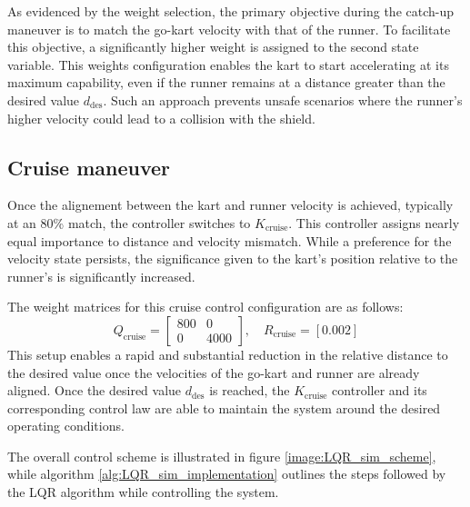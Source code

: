 \documentclass[a4paper,12pt,oneside]{book}
\begin{document}
As evidenced by the weight selection, the primary objective during the catch-up maneuver is to match the go-kart velocity with that of the runner.
To facilitate this objective, a significantly higher weight is assigned to the second state variable.
This weights configuration enables the kart to start accelerating at its maximum capability, even if the runner remains at a distance greater than the desired value $d_{\text{des}}$.
Such an approach prevents unsafe scenarios where the runner's higher velocity could lead to a collision with the shield.

\subsection{Cruise maneuver}
Once the alignement between the kart and runner velocity is achieved, typically at an 80\% match, the controller switches to $K_{\text{cruise}}$.
This controller assigns nearly equal importance to distance and velocity mismatch.
While a preference for the velocity state persists, the significance given to the kart's position relative to the runner's is significantly increased.

The weight matrices for this cruise control configuration are as follows:
\begin{equation}
    Q_{\text{cruise}} =
    \begin{bmatrix}
        800 & 0 \\
        0 & 4000
    \end{bmatrix},
    \quad
    R_{\text{cruise}} = [0.002]
\end{equation}
This setup enables a rapid and substantial reduction in the relative distance to the desired value once the velocities of the go-kart and runner are already aligned.
Once the desired value $d_{\text{des}}$ is reached, the $K_{\text{cruise}}$ controller and its corresponding control law are able to maintain the system around the desired operating conditions.

\bigskip
The overall control scheme is illustrated in figure \ref{image:LQR_sim_scheme}, while algorithm \ref{alg:LQR_sim_implementation} outlines the steps followed by the LQR algorithm while controlling the system.
\end{document}
